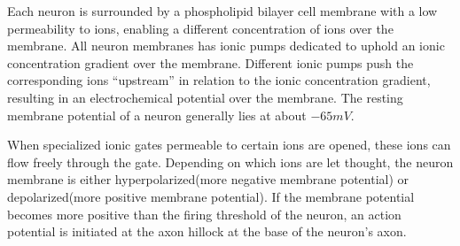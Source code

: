 		



		Each neuron is surrounded by a phospholipid bilayer cell membrane with a low permeability to ions, enabling a different concentration of ions over the membrane.
		All neuron membranes has ionic pumps dedicated to uphold an ionic concentration gradient over the membrane.
		Different ionic pumps push the corresponding ions ``upstream'' in relation to the ionic concentration gradient, resulting in an electrochemical potential over the membrane.
		The resting membrane potential of a neuron generally lies at about $-65mV$. 
		\cite{NeuroscienceExploringTheBrain3edKAP3} %

		When specialized ionic gates permeable to certain ions are opened, these ions can flow freely through the gate.
		Depending on which ions are let thought, the neuron membrane is either hyperpolarized(more negative membrane potential) or depolarized(more positive membrane potential).
		If the membrane potential becomes more positive than the firing threshold of the neuron, an action potential is initiated at the axon hillock at the base of the neuron's axon. 
		\cite{PrinciplesOfNeuralScience4edKAP07}



